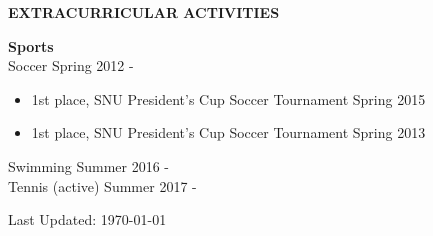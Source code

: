\documentclass[12pt]{article}
\begin{document}
\vspace{0.2in} %


\begin{center}
	{\noindent \bfseries EXTRACURRICULAR ACTIVITIES}
    \noindent\makebox[\linewidth]{\rule{0.75\paperwidth}{0.4pt}}
\end{center}

\noindent
{\bfseries Sports} \\ 
\noindent Soccer \hfill Spring 2012 -
\begin{itemize} \itemsep -2pt %
	\item 1st place, SNU President's Cup Soccer Tournament \hfill Spring 2015
	\item 1st place, SNU President's Cup Soccer Tournament \hfill Spring 2013
\end{itemize}
\noindent Swimming \hfill Summer 2016 - \\ 
\noindent Tennis (active) \hfill Summer 2017 - \\

\vspace{0.2in} %

Last Updated: \monthdayyeardate\today
\end{document}
